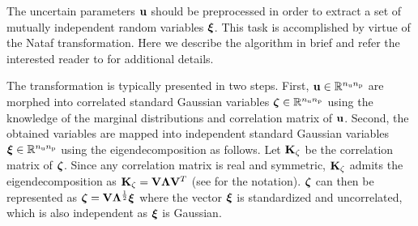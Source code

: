 The uncertain parameters $\mathbf{u}$ should be preprocessed in order to extract a set of mutually independent random variables $\bm{\xi}$.
This task is accomplished by virtue of the Nataf transformation.
Here we describe the algorithm in brief and refer the interested reader to \cite{li2008} for additional details.

The transformation is typically presented in two steps.
First, $\mathbf{u} \in \mathbb{R}^{{n_\text{u}} {n_\text{p}}}$ are morphed into correlated standard Gaussian variables $\bm{\zeta} \in \mathbb{R}^{{n_\text{u}} {n_\text{p}}}$ using the knowledge of the marginal distributions and correlation matrix of $\mathbf{u}$.
Second, the obtained variables are mapped into independent standard Gaussian variables $\bm{\xi} \in \mathbb{R}^{{n_\text{u}} {n_\text{p}}}$ using the eigendecomposition as follows.
Let $\mathbf{K}_\zeta$ be the correlation matrix of $\bm{\zeta}$.
Since any correlation matrix is real and symmetric, $\mathbf{K}_\zeta$ admits the eigendecomposition as $\mathbf{K}_\zeta = \mathbf{V} \mathbf{\Lambda} \mathbf{V}^T$ (see  for the notation).
$\bm{\zeta}$ can then be represented as $\bm{\zeta} = \mathbf{V} \mathbf{\Lambda}^\frac{1}{2} \bm{\xi}$ where the vector $\bm{\xi}$ is standardized and uncorrelated, which is also independent as $\bm{\xi}$ is Gaussian.

